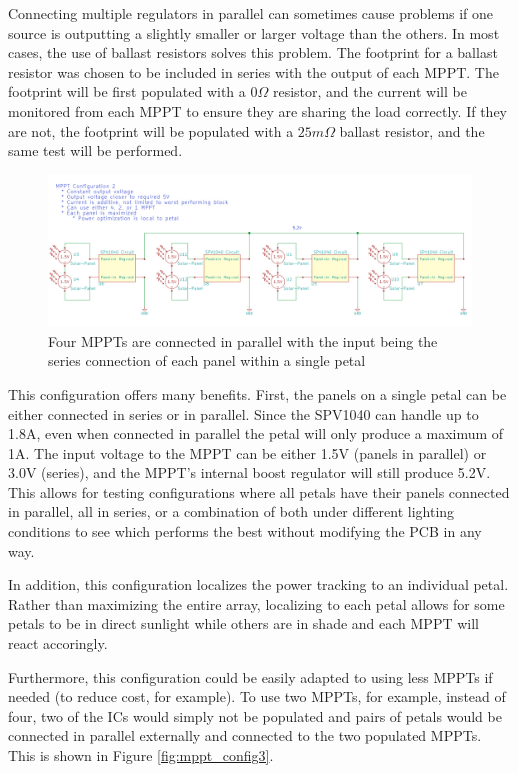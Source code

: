 \documentclass{article}
\numberwithin{figure}{section}
\numberwithin{equation}{section}
\begin{document}
{\bigskip
Connecting multiple regulators in parallel can sometimes cause problems if one source is outputting a slightly smaller or larger voltage than the others. In most cases, the use of ballast resistors solves this problem. The footprint for a ballast resistor was chosen to be included in series with the output of each MPPT. The footprint will be first populated with a 0$\Omega$ resistor, and the current will be monitored from each MPPT to ensure they are sharing the load correctly. If they are not, the footprint will be populated with a $25m\Omega$ ballast resistor, and the same test will be performed.

\begin{figure}[H]
  \centering
  \includegraphics[width=1.0\textwidth]{MPPTConfig2}
  \caption{Four MPPTs are connected in parallel with the input being the series connection of each panel within a single petal}
  \label{fig:mppt_config2}
\end{figure}

This configuration offers many benefits. First, the panels on a single petal can be either connected in series or in parallel. Since the SPV1040 can handle up to 1.8A, even when connected in parallel the petal will only produce a maximum of 1A. The input voltage to the MPPT can be either 1.5V (panels in parallel) or 3.0V (series), and the MPPT's internal boost regulator will still produce 5.2V. This allows for testing configurations where all petals have their panels connected in parallel, all in series, or a combination of both under different lighting conditions to see which performs the best without modifying the PCB in any way.

\bigskip
In addition, this configuration localizes the power tracking to an individual petal. Rather than maximizing the entire array, localizing to each petal allows for some petals to be in direct sunlight while others are in shade and each MPPT will react accoringly.

\bigskip
Furthermore, this configuration could be easily adapted to using less MPPTs if needed (to reduce cost, for example). To use two MPPTs, for example, instead of four, two of the ICs would simply not be populated and pairs of petals would be connected in parallel externally and connected to the two populated MPPTs. This is shown in Figure \ref{fig:mppt_config3}.

}
\end{document}
